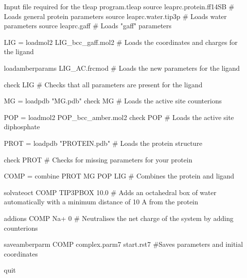         \begin{inpfile}[label=file:tleap]{Input file required for the tleap program.}{tleap}
source leaprc.protein.ff14SB        # Loads general protein parameters
source leaprc.water.tip3p           # Loads water parameters
source leaprc.gaff                  # Loads "gaff" parameters

LIG = loadmol2 LIG_bcc_gaff.mol2    
# Loads the coordinates and charges for the ligand

loadamberparams LIG_AC.frcmod       
# Loads the new parameters for the ligand

check LIG                           
# Checks that all parameters are present for the ligand

MG = loadpdb "MG.pdb"
check MG
# Loads the active site counterions

POP = loadmol2 POP_bcc_amber.mol2
check POP
# Loads the active site diphosphate

PROT = loadpdb "PROTEIN.pdb"        
# Loads the protein structure

check PROT                          
# Checks for missing parameters for your protein

COMP = combine {PROT MG POP LIG}           
# Combines the protein and ligand

solvateoct COMP TIP3PBOX 10.0        
# Adds an octahedral box of water automatically with a minimum distance of 10 A from the protein

addions COMP Na+ 0                  
# Neutralises the net charge of the system by adding counterions

saveamberparm COMP complex.parm7 start.rst7 
#Saves parameters and initial coordinates

quit
        \end{inpfile}